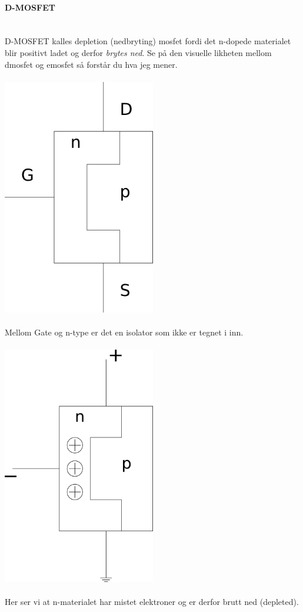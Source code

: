 \paragraph{D-MOSFET} \mbox{} \\
D-MOSFET kalles depletion (nedbryting) mosfet fordi det n-dopede materialet blir
positivt ladet og derfor \emph{brytes ned}.
Se på den visuelle likheten mellom dmosfet og emosfet så forstår du hva
jeg mener.
\\\\
\includegraphics[width=0.5\textwidth]{./img/dmosfet}
\\\\
Mellom Gate og n-type er det en isolator som ikke er tegnet i inn.
\\\\
\includegraphics[width=0.5\textwidth]{./img/dmosfet-depleted}
\\\\
Her ser vi at n-materialet har mistet elektroner og er derfor brutt
ned (depleted).




